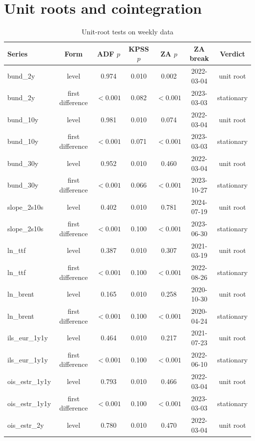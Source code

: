 \documentclass[11pt,a4paper]{article}
\begin{document}
\clearpage
\section{Unit roots and cointegration}

\begin{table}[htbp]\centering\scriptsize
\caption{Unit-root tests on weekly data}\label{tab:ur}
\setlength{\tabcolsep}{5pt}
\begin{tabular}{@{}lcccccc@{}}
\toprule
Series & Form & ADF $p$ & KPSS $p$ & ZA $p$ & ZA break & Verdict\\\midrule
bund\_2y & level & 0.974 & 0.010 & 0.002 & 2022-03-04 & unit root\\
bund\_2y & first difference & $<0.001$ & 0.082 & $<0.001$ & 2023-03-03 & stationary\\
bund\_10y & level & 0.981 & 0.010 & 0.074 & 2022-03-04 & unit root\\
bund\_10y & first difference & $<0.001$ & 0.071 & $<0.001$ & 2023-03-03 & stationary\\
bund\_30y & level & 0.952 & 0.010 & 0.460 & 2022-03-04 & unit root\\
bund\_30y & first difference & $<0.001$ & 0.066 & $<0.001$ & 2023-10-27 & stationary\\
slope\_2s10s & level & 0.402 & 0.010 & 0.781 & 2024-07-19 & unit root\\
slope\_2s10s & first difference & $<0.001$ & 0.100 & $<0.001$ & 2023-06-30 & stationary\\
ln\_ttf & level & 0.387 & 0.010 & 0.307 & 2021-03-19 & unit root\\
ln\_ttf & first difference & $<0.001$ & 0.100 & $<0.001$ & 2022-08-26 & stationary\\
ln\_brent & level & 0.165 & 0.010 & 0.258 & 2020-10-30 & unit root\\
ln\_brent & first difference & $<0.001$ & 0.100 & $<0.001$ & 2020-04-24 & stationary\\
ils\_eur\_1y1y & level & 0.464 & 0.010 & 0.217 & 2021-07-23 & unit root\\
ils\_eur\_1y1y & first difference & $<0.001$ & 0.100 & $<0.001$ & 2022-06-10 & stationary\\
ois\_estr\_1y1y & level & 0.793 & 0.010 & 0.466 & 2022-03-04 & unit root\\
ois\_estr\_1y1y & first difference & $<0.001$ & 0.100 & $<0.001$ & 2023-03-03 & stationary\\
ois\_estr\_2y & level & 0.780 & 0.010 & 0.470 & 2022-03-04 & unit root\\

\end{tabular}
\end{table}
\end{document}
